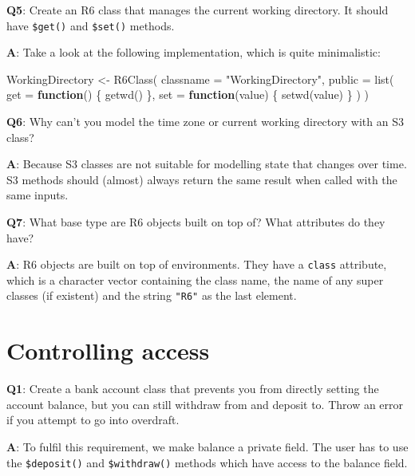 \documentclass[
]{krantz}
\makeatletter
\newenvironment{Shaded}{\begin{snugshade}}{\end{snugshade}}
\newcommand{\ControlFlowTok}[1]{\textcolor[rgb]{0.13,0.29,0.53}{\textbf{#1}}}
\newcommand{\DataTypeTok}[1]{\textcolor[rgb]{0.13,0.29,0.53}{#1}}
\newcommand{\KeywordTok}[1]{\textcolor[rgb]{0.13,0.29,0.53}{\textbf{#1}}}
\newcommand{\NormalTok}[1]{#1}
\newcommand{\StringTok}[1]{\textcolor[rgb]{0.31,0.60,0.02}{#1}}
\newenvironment{kframe}{%
\medskip{}
\setlength{\fboxsep}{.8em}
 \def\at@end@of@kframe{}%
 \ifinner\ifhmode%
  \def\at@end@of@kframe{\end{minipage}}%
  \begin{minipage}{\columnwidth}%
 \fi\fi%
 \def\FrameCommand##1{\hskip\@totalleftmargin \hskip-\fboxsep
 \colorbox{shadecolor}{##1}\hskip-\fboxsep
     \hskip-\linewidth \hskip-\@totalleftmargin \hskip\columnwidth}%
 \MakeFramed {\advance\hsize-\width
   \@totalleftmargin\z@ \linewidth\hsize
   \@setminipage}}%
 {\par\unskip\endMakeFramed%
 \at@end@of@kframe}
\renewenvironment{Shaded}{\begin{kframe}}{\end{kframe}}
\renewcommand{\KeywordTok} [1]{\textcolor[rgb]{0.00,0.44,0.13}{{#1}}}
\renewcommand{\DataTypeTok}[1]{\textcolor[rgb]{0.56,0.13,0.00}{{#1}}}
\renewcommand{\StringTok}  [1]{\textcolor[rgb]{0.25,0.44,0.63}{{#1}}}
\renewcommand{\NormalTok}  [1]{{#1}}
\makeatother
\begin{document}
\textbf{{Q5}}: Create an R6 class that manages the current working directory. It should have \texttt{\$get()} and \texttt{\$set()} methods.

\textbf{{A}}: Take a look at the following implementation, which is quite minimalistic:

\begin{Shaded}
\begin{Highlighting}[]
\NormalTok{WorkingDirectory <-}\StringTok{ }\KeywordTok{R6Class}\NormalTok{(}
  \DataTypeTok{classname =} \StringTok{"WorkingDirectory"}\NormalTok{,}
  \DataTypeTok{public =} \KeywordTok{list}\NormalTok{(}
    \DataTypeTok{get =} \ControlFlowTok{function}\NormalTok{() \{}
      \KeywordTok{getwd}\NormalTok{()}
\NormalTok{    \},}
    \DataTypeTok{set =} \ControlFlowTok{function}\NormalTok{(value) \{}
      \KeywordTok{setwd}\NormalTok{(value)}
\NormalTok{    \}}
\NormalTok{  )}
\NormalTok{)}
\end{Highlighting}
\end{Shaded}

\textbf{{Q6}}: Why can't you model the time zone or current working directory with an S3 class?

\textbf{{A}}: Because S3 classes are not suitable for modelling state that changes over time. S3 methods should (almost) always return the same result when called with the same inputs.

\textbf{{Q7}}: What base type are R6 objects built on top of? What attributes do they have?

\textbf{{A}}: R6 objects are built on top of environments. They have a \texttt{class} attribute, which is a character vector containing the class name, the name of any super classes (if existent) and the string \texttt{"R6"} as the last element.

\hypertarget{controlling-access}{%
\section{Controlling access}\label{controlling-access}}

\textbf{{Q1}}: Create a bank account class that prevents you from directly setting the account balance, but you can still withdraw from and deposit to. Throw an error if you attempt to go into overdraft.

\textbf{{A}}: To fulfil this requirement, we make balance a private field. The user has to use the \texttt{\$deposit()} and \texttt{\$withdraw()} methods which have access to the balance field.
\end{document}
